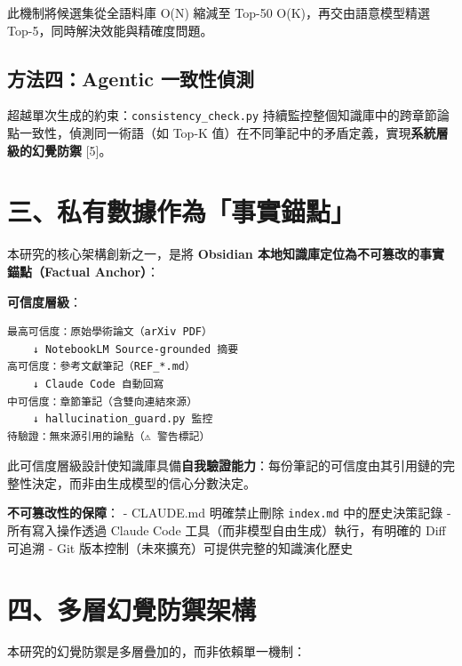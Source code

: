 此機制將候選集從全語料庫 O(N) 縮減至 Top-50 O(K)，再交由語意模型精選
Top-5，同時解決效能與精確度問題。

\subsection{方法四：Agentic
一致性偵測}\label{ux65b9ux6cd5ux56dbagentic-ux4e00ux81f4ux6027ux5075ux6e2c}

超越單次生成的約束：\texttt{consistency\_check.py}
持續監控整個知識庫中的跨章節論點一致性，偵測同一術語（如 Top-K
值）在不同筆記中的矛盾定義，實現\textbf{系統層級的幻覺防禦} {[}5{]}。

\section{三、私有數據作為「事實錨點」}\label{ux4e09ux79c1ux6709ux6578ux64daux4f5cux70baux4e8bux5be6ux9328ux9ede}

本研究的核心架構創新之一，是將 \textbf{Obsidian
本地知識庫定位為不可篡改的事實錨點（Factual Anchor）}：

\textbf{可信度層級}：

\begin{verbatim}
最高可信度：原始學術論文（arXiv PDF）
    ↓ NotebookLM Source-grounded 摘要
高可信度：參考文獻筆記（REF_*.md）
    ↓ Claude Code 自動回寫
中可信度：章節筆記（含雙向連結來源）
    ↓ hallucination_guard.py 監控
待驗證：無來源引用的論點（⚠️ 警告標記）
\end{verbatim}

此可信度層級設計使知識庫具備\textbf{自我驗證能力}：每份筆記的可信度由其引用鏈的完整性決定，而非由生成模型的信心分數決定。

\textbf{不可篡改性的保障}： - CLAUDE.md 明確禁止刪除 \texttt{index.md}
中的歷史決策記錄 - 所有寫入操作透過 Claude Code
工具（而非模型自由生成）執行，有明確的 Diff 可追溯 - Git
版本控制（未來擴充）可提供完整的知識演化歷史

\section{四、多層幻覺防禦架構}\label{ux56dbux591aux5c64ux5e7bux89baux9632ux79a6ux67b6ux69cb}

本研究的幻覺防禦是多層疊加的，而非依賴單一機制：

